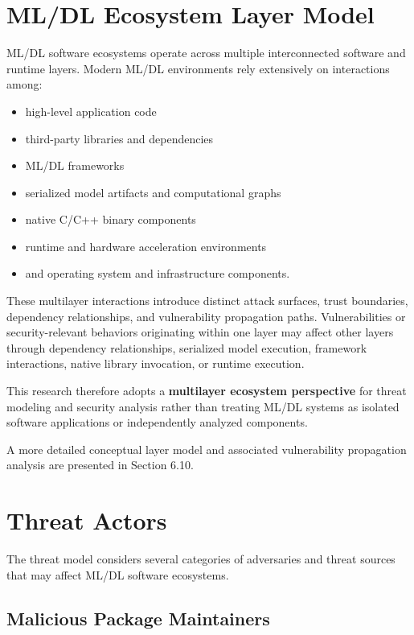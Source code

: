 \documentclass[
  12pt,
  letterpaper,
  oneside]{report}
\providecommand{\tightlist}{%
  \setlength{\itemsep}{0pt}\setlength{\parskip}{0pt}}
\begin{document}
\section{ML/DL Ecosystem Layer Model}\label{62-mldl-ecosystem-layer-model}

ML/DL software ecosystems operate across multiple interconnected
software and runtime layers. Modern ML/DL environments rely extensively
on interactions among:

\begin{itemize}
\tightlist
\item
  high-level application code
\item
  third-party libraries and dependencies
\item
  ML/DL frameworks
\item
  serialized model artifacts and computational graphs
\item
  native C/C++ binary components
\item
  runtime and hardware acceleration environments
\item
  and operating system and infrastructure components.
\end{itemize}

These multilayer interactions introduce distinct attack surfaces, trust
boundaries, dependency relationships, and vulnerability propagation
paths. Vulnerabilities or security-relevant behaviors originating within
one layer may affect other layers through dependency relationships,
serialized model execution, framework interactions, native library
invocation, or runtime execution.

This research therefore adopts a \textbf{multilayer ecosystem
perspective} for threat modeling and security analysis rather than
treating ML/DL systems as isolated software applications or
independently analyzed components.

A more detailed conceptual layer model and associated vulnerability
propagation analysis are presented in Section 6.10.

\section{Threat Actors}\label{63-threat-actors}

The threat model considers several categories of adversaries and threat
sources that may affect ML/DL software ecosystems.

\subsection{Malicious Package Maintainers}\label{631-malicious-package-maintainers}
\end{document}
